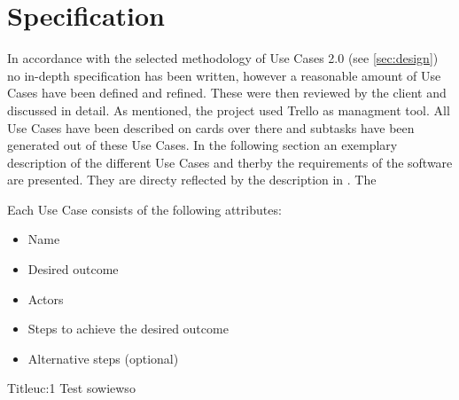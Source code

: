 \section{Specification}
\label{sec:specification}

In accordance with the selected methodology of Use Cases 2.0 (see \autoref{sec:design}) no in-depth specification has been written, however a reasonable amount of Use Cases have been defined and refined. These were then reviewed by the client and discussed in detail. As mentioned, the project used Trello as managment tool. All Use Cases have been described on cards over there and subtasks have been generated out of these Use Cases. In the following section an exemplary description of the different Use Cases and therby the requirements of the software are presented. They are directy reflected by the description in \cite{sassoon2014,sassoon2106, sassoon2016CD}. The

Each Use Case consists of the following attributes:

\begin{itemize}
\item Name
\item Desired outcome
\item Actors
\item Steps to achieve the desired outcome
\item Alternative steps (optional)
\end{itemize}

\begin{usecase}{Title}{uc:1}
	Test sowiewso \\
\end{usecase}